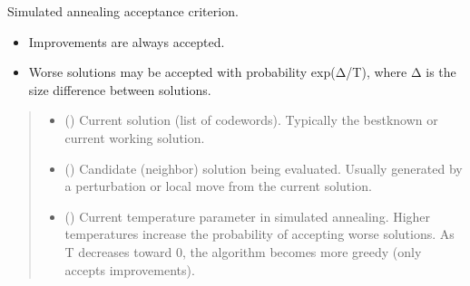 \documentclass[letterpaper,10pt,english]{sphinxmanual}
\begin{document}
\begin{fulllineitems}
\label{\detokenize{index:hammindist.functions.accept}}
\pysigstartsignatures
\pysiglinewithargsret
{}
{\sphinxparamcomma {}\sphinxparamcomma {}}
{}
\pysigstopsignatures
\sphinxAtStartPar
Simulated annealing acceptance criterion.
\begin{itemize}
\item {} 
\sphinxAtStartPar
Improvements are always accepted.

\item {} 
\sphinxAtStartPar
Worse solutions may be accepted with probability
exp(Δ/T), where Δ is the size difference between solutions.

\end{itemize}
\begin{quote}\begin{description}
\begin{itemize}
\item {} 
\sphinxAtStartPar
{} (\sphinxstyleliteralemphasis{\sphinxupquote{{[}}}\sphinxstyleliteralemphasis{\sphinxupquote{{]}}}) \textendash{} Current solution (list of codewords).
Typically the best\sphinxhyphen{}known or current
working solution.

\item {} 
\sphinxAtStartPar
{} (\sphinxstyleliteralemphasis{\sphinxupquote{{[}}}\sphinxstyleliteralemphasis{\sphinxupquote{{]}}}) \textendash{} Candidate (neighbor) solution being evaluated.
Usually generated by a perturbation or
local move from the current solution.

\item {} 
\sphinxAtStartPar
{} () \textendash{} Current temperature parameter in simulated annealing.
Higher temperatures increase the probability of accepting
worse solutions. As T decreases toward 0, the algorithm
becomes more greedy (only accepts improvements).

\end{itemize}


\end{description}
\end{quote}
\end{fulllineitems}
\end{document}
